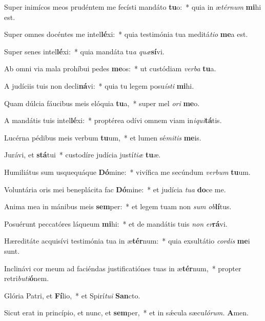\item Super inimícos meos prudéntem me fecísti mandáto \textbf{tu}o:~* quia in æ\tinyhspace\textit{térnum} \textbf{mi}hi est.
\item Super omnes docéntes me intel\textbf{lé}xi:~* quia testimónia tua meditá\tinyhspace\textit{tio} \textbf{me}a est.
\item Super senes intel\textbf{lé}xi:~* quia mandáta tu\tinyhspace\textit{a} \textit{quæ}\textbf{sí}vi.
\item Ab omni via mala prohíbui pedes \textbf{me}os:~* ut custódiam \textit{verba} \textbf{tu}a.
\item A judíciis tuis non decli\textbf{ná}vi:~* quia tu legem posu\textit{ísti} \textbf{mi}hi.
\item Quam dúlcia fáucibus meis elóquia \textbf{tu}a,~* super mel \textit{ori} \textbf{me}o.
\item A mandátis tuis intel\textbf{lé}xi:~* proptérea odívi omnem viam in\textit{iqui}\textbf{tá}tis.
\item Lucérna pédibus meis verbum \textbf{tu}um,~* et lumen sé\textit{mitis} \textbf{me}is.
\item Jurávi, et \textbf{stá}tui~* custodíre judícia ju\-stí\textit{tiæ} \textbf{tu}æ.
\item Humiliátus sum usquequáque \textbf{Dó}mine:~* vivífica me secúndum \textit{verbum} \textbf{tu}um.
\item Voluntária oris mei beneplácita fac \textbf{Dó}mine:~* et judícia \textit{tua} \textbf{do}ce me.
\item Anima mea in mánibus meis \textbf{sem}per:~* et legem tuam non \textit{sum} \textit{ob}\textbf{lí}tus.
\item Posuérunt peccatóres láqueum \textbf{mi}hi:~* et de mandátis tuis \textit{non} \textit{er}\textbf{rá}vi.
\item Hæreditáte acquisívi testimónia tua in æ\textbf{tér}num:~* quia exsultátio \textit{cordis} \textbf{me}i sunt.
\item Inclinávi cor meum ad faciéndas justificatiónes tuas in æ\textbf{tér}num,~* propter retri\textit{buti}\textbf{ó}nem.
\item Glória Patri, et \textbf{Fí}lio,~* et Spirí\tinyhspace\textit{tui} \textbf{San}cto.
\item Sicut erat in princípio, et nunc, et \textbf{sem}per,~* et in sǽcula sæcu\tinyhspace\textit{lórum.} \textbf{A}men.